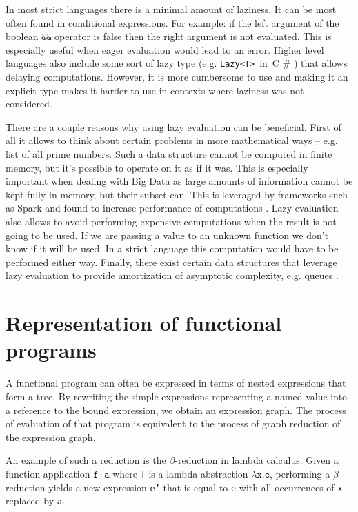 \documentclass[en]{pracamgr}
\newcommand{\shrp}{%
  {\fontfamily{ppl}\selectfont\#%
  }}
\begin{document}
In most strict languages there is a minimal amount of
laziness. It can be most often found in conditional expressions.
For example: if the left argument of the
boolean \texttt{\&\&} operator is false then the right argument is not
evaluated. This is especially useful when eager evaluation would lead
to an error. Higher level languages also include some sort of lazy
type (e.g. \verb|Lazy<T>|~in~C\shrp) that allows delaying computations.
However, it is more cumbersome to use and making it an explicit type
makes it harder to use in contexts where laziness was not considered.

There are a couple reasons why using lazy evaluation can be beneficial.
First of all it allows to think about certain problems in more mathematical
ways -- e.g. list of all prime numbers. Such a data structure cannot
be computed in finite memory, but it's possible to operate on it as if it
was. This is especially important when dealing with Big Data as large
amounts of information cannot be kept fully in memory, but their subset can.
This is leveraged by frameworks such as Spark and found to increase performance
of computations \cite{lazySpark}. Lazy evaluation also allows to avoid
performing expensive computations when the result is not going to be used.
If we are passing a value to an unknown function we don't know if it 
will be used. In a strict language this computation would have to
be performed either way. Finally, there exist certain data structures that
leverage lazy evaluation to provide amortization of asymptotic complexity,
e.g. queues \cite{amortized}.

\section{Representation of functional programs}

A functional program can often be expressed in terms of
nested expressions that form a tree. By rewriting the
simple expressions representing a named value into a
reference to the bound expression, we obtain an expression
graph. The process of evaluation of that program is
equivalent to the process of graph reduction of the expression graph.

An example of such a reduction is the $\beta$-reduction in lambda calculus.
Given a function application $\mathtt{f\cdot a}$ where
\texttt{f} is a lambda abstraction $\mathtt{\lambda x. e}$,
performing a $\beta$-reduction yields a new expression
\texttt{e'} that is equal to \texttt{e} with all
occurrences of \texttt{x} replaced by \texttt{a}.
\end{document}
